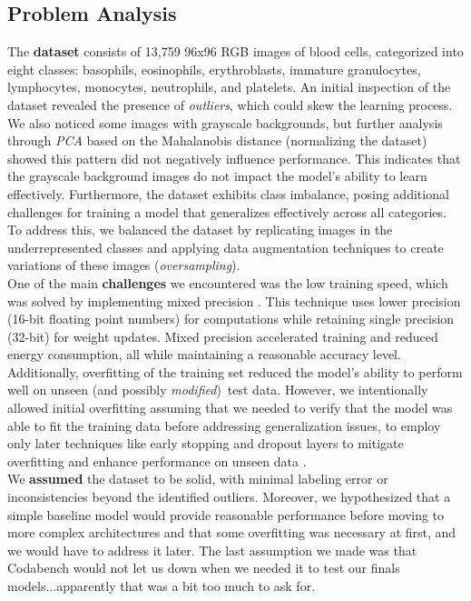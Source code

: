 \documentclass[11pt]{article}
\begin{document}
\begin{multicols*}{2}
        \section{Problem Analysis}
        The \textbf{dataset} consists of  13,759 96x96 RGB images of blood cells, categorized into eight classes: basophils, eosinophils, erythroblasts, immature granulocytes, lymphocytes, monocytes, neutrophils, and platelets. An initial inspection of the dataset revealed the presence of \textit{outliers}, which could skew the learning process. We also noticed some images with grayscale backgrounds, but further analysis through \textit{PCA} based on the Mahalanobis distance \cite{outliers} (normalizing the dataset) showed this pattern did not negatively influence performance. This indicates that the grayscale background images do not impact the model's ability to learn effectively. Furthermore, the dataset exhibits class imbalance, posing additional challenges for training a model that generalizes effectively across all categories. To address this, we balanced the dataset by replicating images in the underrepresented classes and applying data augmentation techniques to create variations of these images (\textit{oversampling})\cite{oversampling}.
        \\One of the main \textbf{challenges} we encountered was the low training speed, which was solved by implementing mixed precision \cite{mixed-precision}. This technique uses lower precision (16-bit floating point numbers) for computations while retaining single precision (32-bit) for weight updates. Mixed precision accelerated training and reduced energy consumption, all while maintaining a reasonable accuracy level. Additionally, overfitting of the training set reduced the model's ability to perform well on unseen (and possibly \textit{modified})\ test data. However, we intentionally allowed initial overfitting assuming that we needed to verify that the model was able to fit the training data before addressing generalization issues, to employ only later techniques like early stopping and dropout layers to mitigate overfitting and enhance performance on unseen data \cite{overfitting}.
        \\We \textbf{assumed} the dataset to be solid, with minimal labeling error or inconsistencies beyond the identified outliers. Moreover, we hypothesized that a simple baseline model would provide reasonable performance before moving to more complex architectures and that some overfitting was necessary at first, and we would have to address it later. The last assumption we made was that Codabench would not let us down when we needed it to test our finals models...apparently that was a bit too much to ask for.

\end{multicols*}
\end{document}
